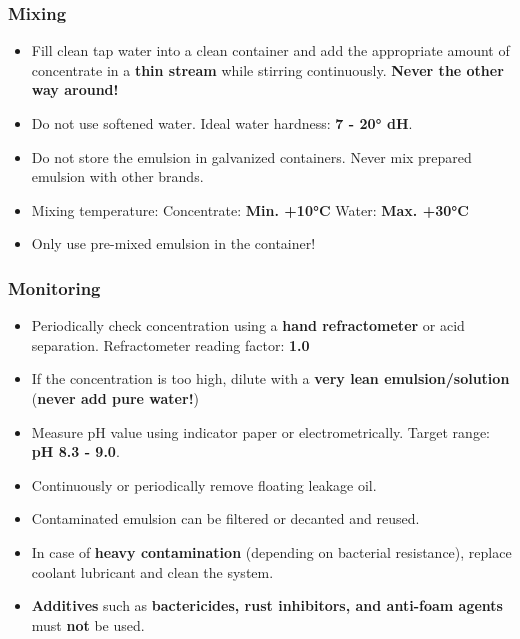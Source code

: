 \subsubsection*{Mixing}
\begin{itemize}
    \item Fill clean tap water into a clean container and add the appropriate amount of concentrate in a \textbf{thin stream} while stirring continuously.  
          \textbf{Never the other way around!}
    \item Do not use softened water. Ideal water hardness: \textbf{7 - 20° dH}.
    \item Do not store the emulsion in galvanized containers. Never mix prepared emulsion with other brands.
    \item Mixing temperature:  
          \quad Concentrate: \textbf{Min. +10°C}  
          \quad Water: \textbf{Max. +30°C}
    \item Only use pre-mixed emulsion in the container!
\end{itemize}

\subsubsection*{Monitoring}
\begin{itemize}
    \item Periodically check concentration using a \textbf{hand refractometer} or acid separation.  
          Refractometer reading factor: \textbf{1.0}
    \item If the concentration is too high, dilute with a \textbf{very lean emulsion/solution}  
          (\textbf{never add pure water!})
    \item Measure pH value using indicator paper or electrometrically.  
          Target range: \textbf{pH 8.3 - 9.0}.
    \item Continuously or periodically remove floating leakage oil.
    \item Contaminated emulsion can be filtered or decanted and reused.
    \item In case of \textbf{heavy contamination} (depending on bacterial resistance), replace coolant lubricant and clean the system.
    \item \textbf{Additives} such as \textbf{bactericides, rust inhibitors, and anti-foam agents} must \textbf{not} be used.
\end{itemize}

\setcounter{section}{10}

